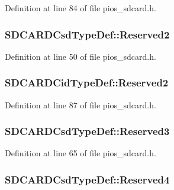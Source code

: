 Definition at line 84 of file pios\-\_\-sdcard.\-h.

\hypertarget{group___p_i_o_s___s_d_c_a_r_d_ga2580f84971aaa12e06b546fd8b884dad}{
\subsubsection[{Reserved2}]{ S\-D\-C\-A\-R\-D\-Csd\-Type\-Def\-::\-Reserved2}}\label{group___p_i_o_s___s_d_c_a_r_d_ga2580f84971aaa12e06b546fd8b884dad}


Definition at line 50 of file pios\-\_\-sdcard.\-h.

\hypertarget{group___p_i_o_s___s_d_c_a_r_d_gab50b795387215c00e5d9b5feb7e9aefb}{
\subsubsection[{Reserved2}]{ S\-D\-C\-A\-R\-D\-Cid\-Type\-Def\-::\-Reserved2}}\label{group___p_i_o_s___s_d_c_a_r_d_gab50b795387215c00e5d9b5feb7e9aefb}


Definition at line 87 of file pios\-\_\-sdcard.\-h.

\hypertarget{group___p_i_o_s___s_d_c_a_r_d_ga2912ee762425a05b026c2c66039b859b}{
\subsubsection[{Reserved3}]{ S\-D\-C\-A\-R\-D\-Csd\-Type\-Def\-::\-Reserved3}}\label{group___p_i_o_s___s_d_c_a_r_d_ga2912ee762425a05b026c2c66039b859b}


Definition at line 65 of file pios\-\_\-sdcard.\-h.

\hypertarget{group___p_i_o_s___s_d_c_a_r_d_ga2154190e5c6f32ce3b67bdc4a9aa3982}{
\subsubsection[{Reserved4}]{ S\-D\-C\-A\-R\-D\-Csd\-Type\-Def\-::\-Reserved4}}\label{group___p_i_o_s___s_d_c_a_r_d_ga2154190e5c6f32ce3b67bdc4a9aa3982}


